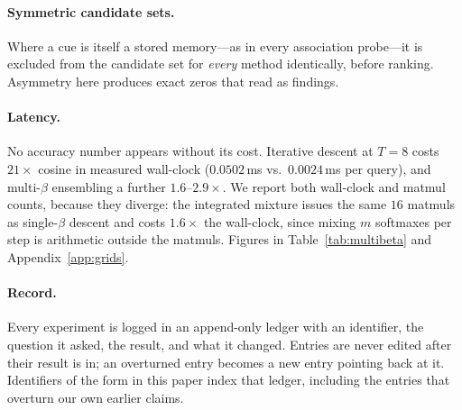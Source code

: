 \paragraph{Symmetric candidate sets.} Where a cue is itself a stored memory---as in every
association probe---it is excluded from the candidate set for \emph{every} method
identically, before ranking. Asymmetry here produces exact zeros that read as findings.

\paragraph{Latency.} No accuracy number appears without its cost. Iterative descent at
$T{=}8$ costs $21\times$ cosine in measured wall-clock ($0.0502$\,ms vs.\ $0.0024$\,ms per
query), and multi-$\beta$ ensembling a further $1.6$--$2.9\times$. We report both wall-clock
and matmul counts, because they diverge: the integrated mixture issues the same $16$ matmuls
as single-$\beta$ descent and costs $1.6\times$ the wall-clock, since mixing $m$ softmaxes
per step is arithmetic outside the matmuls. Figures in Table~\ref{tab:multibeta} and
Appendix~\ref{app:grids}.

\paragraph{Record.} Every experiment is logged in an append-only ledger with an identifier,
the question it asked, the result, and what it changed. Entries are never edited after their
result is in; an overturned entry becomes a new entry pointing back at it. Identifiers of
the form  in this paper index that ledger, including the entries that overturn our
own earlier claims.
